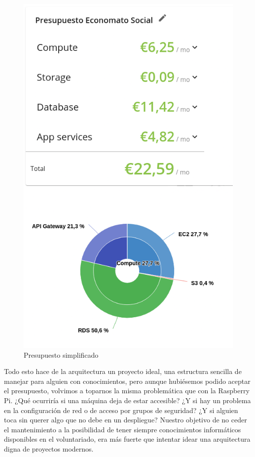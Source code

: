 \begin{figure}[h]
\centering
\includegraphics[scale=0.6]{archivos/budgetAws.png}
\caption{Presupuesto simplificado}
\end{figure}
\clearpage
\vspace{1em}
\par Todo esto hace de la arquitectura un proyecto ideal, una estructura sencilla de manejar para alguien con conocimientos, pero aunque hubiésemos podido aceptar el presupuesto, volvimos a toparnos la misma problemática que con la Raspberry Pi. ¿Qué ocurriría si una máquina deja de estar accesible? ¿Y si hay un problema en la configuración de red o de acceso por grupos de seguridad? ¿Y si alguien toca sin querer algo que no debe en un despliegue? Nuestro objetivo de no ceder el mantenimiento a la posibilidad de tener siempre conocimientos informáticos disponibles en el voluntariado, era más fuerte que intentar idear una arquitectura digna de proyectos modernos.
